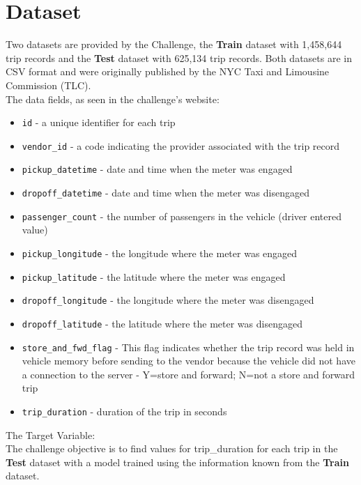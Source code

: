 \documentclass[11pt]{article}
\begin{document}
\section{Dataset}

\hspace{0.5cm}  Two datasets are provided by the Challenge, the \textbf{Train} dataset with 1,458,644 trip records and the \textbf{Test} dataset with 625,134 trip records. Both datasets are in CSV format and were originally published by the NYC Taxi and Limousine Commission (TLC)\cite{challenge_site}.\\

\noindent The data fields, as seen in the challenge's website:

\begin{itemize}
\item \texttt{id} - a unique identifier for each trip
\item \texttt{vendor\_id} - a code indicating the provider associated with the trip record
\item \texttt{pickup\_datetime} - date and time when the meter was engaged
\item \texttt{dropoff\_datetime} - date and time when the meter was disengaged
\item \texttt{passenger\_count} - the number of passengers in the vehicle (driver entered value)
\item \texttt{pickup\_longitude} - the longitude where the meter was engaged
\item \texttt{pickup\_latitude} - the latitude where the meter was engaged
\item \texttt{dropoff\_longitude} - the longitude where the meter was disengaged
\item \texttt{dropoff\_latitude} - the latitude where the meter was disengaged
\item \texttt{store\_and\_fwd\_flag} - This flag indicates whether the trip record was held in vehicle memory before sending to the vendor because the vehicle did not have a connection to the server - Y=store and forward; N=not a store and forward trip
\item \texttt{{trip\_duration}} - duration of the trip in seconds
\end{itemize}

\noindent The Target Variable:\\

The challenge objective is to find values for trip\_duration for each trip in the \textbf{Test} dataset with a model trained using the information known from the \textbf{Train} dataset.
\end{document}
